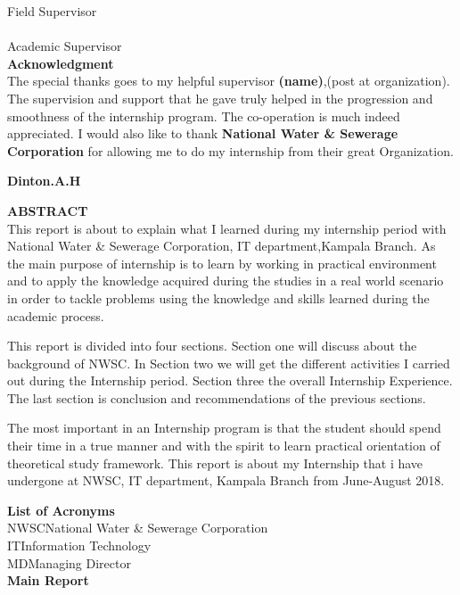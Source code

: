 \documentclass{article}
\begin{document}
Field Supervisor \\
\vspace{.1in}
\makebox[2.5in]{\hrulefill} \hspace{0.3in}\makebox[2.5in]{\dotfill}\\
Academic Supervisor \\
\newpage
\textbf{Acknowledgment}\\
The special thanks goes to my helpful supervisor \textbf{(name)},(post at organization). The supervision and support that he gave truly helped in the progression and smoothness of the internship program. The co-operation is much indeed appreciated. I would also like to thank \textbf{National Water \& Sewerage Corporation} for allowing me to do my internship from their great Organization.
\begin{flushright}
\textbf{Dinton.A.H}
\end{flushright}

\newpage
\textbf{ABSTRACT}\\
This report is about to explain what I learned during my internship period with National Water \& Sewerage Corporation, IT department,Kampala Branch. As the main purpose of internship is to learn by working in practical environment and to apply the knowledge acquired during the studies in a real world scenario in order to tackle problems using the knowledge and skills learned during the academic process.
\par This report is divided into four  sections. Section one will discuss about the background of NWSC. In Section two we will get the different activities I carried out during the Internship period. Section three the overall Internship Experience. The last section is conclusion and recommendations of the previous sections.
\par The most important in an Internship program is that the student should spend their time in a true manner and with the spirit to learn practical orientation of theoretical study framework. This report is about my Internship that i have undergone at NWSC, IT department, Kampala Branch from June-August 2018.
\newpage
\tableofcontents
\thispagestyle{empty}
\cleardoublepage
\setcounter{page}{1}
\newpage
\begin{appendix}
\listoffigures
\newpage
\listoftables
\end{appendix}
\newpage
\textbf{List of Acronyms}\\
NWSC\dotfill  National Water \& Sewerage Corporation\\
IT\dotfill Information Technology\\
MD\dotfill Managing Director\\
\newpage
\textbf{Main Report}\\
\end{document}
